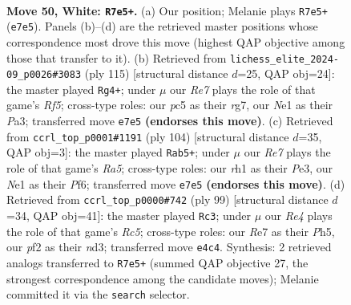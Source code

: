 \documentclass[11pt]{article}
\begin{document}
\clearpage

\begin{figure}[p]\centering
\begin{subfigure}{0.46\textwidth}\centering
\resizebox{\linewidth}{!}{%
\newchessgame
\chessboard[
  setfen={8/4R3/8/2p3kP/4R3/8/1P3p2/3KN2r w - - 1 50},
  showmover=false,
  pgfstyle=straightmove, color=movearrow, markmove={e7-e5}
]}
\caption{}
\end{subfigure}\hfill
\begin{subfigure}{0.46\textwidth}\centering
\resizebox{\linewidth}{!}{%
\newchessgame
\chessboard[
  setfen={8/6R1/4k1p1/4P1P1/r4r2/p5K1/R7/8 b - - 1 58},
  showmover=false,
  pgfstyle=straightmove, color=movearrow, markmove={f4-g4}
]}
\caption{}
\end{subfigure}
\\[4pt]
\begin{subfigure}{0.46\textwidth}\centering
\resizebox{\linewidth}{!}{%
\newchessgame
\chessboard[
  setfen={5r2/7r/1k2KP2/R1R5/1p6/p3P3/8/8 w - - 16 53},
  showmover=false,
  pgfstyle=straightmove, color=movearrow, markmove={a5-b5}
]}
\caption{}
\end{subfigure}\hfill
\begin{subfigure}{0.46\textwidth}\centering
\resizebox{\linewidth}{!}{%
\newchessgame
\chessboard[
  setfen={8/8/8/R1nk3p/p1r5/P2NK2P/8/8 b - - 3 50},
  showmover=false,
  pgfstyle=straightmove, color=movearrow, markmove={c4-c3}
]}
\caption{}
\end{subfigure}
\caption{\textbf{Move 50, White: \texttt{R7e5+}.} (a) Our position; Melanie plays \texttt{R7e5+} (\texttt{e7e5}). Panels (b)--(d) are the retrieved master positions whose correspondence most drove this move (highest QAP objective among those that transfer to it). (b) Retrieved from \texttt{lichess\_elite\_2024-09\_p0026\#3083} (ply 115) [structural distance $d$=25, QAP obj=24]: the master played \texttt{Rg4+}; under $\mu$ our \emph{Re7} plays the role of that game's \emph{Rf5}; cross-type roles: our \emph{p}c5 as their \emph{r}g7, our \emph{N}e1 as their \emph{P}a3; transferred move \texttt{e7e5} \textbf{(endorses this move)}. (c) Retrieved from \texttt{ccrl\_top\_p0001\#1191} (ply 104) [structural distance $d$=35, QAP obj=3]: the master played \texttt{Rab5+}; under $\mu$ our \emph{Re7} plays the role of that game's \emph{Ra5}; cross-type roles: our \emph{r}h1 as their \emph{P}e3, our \emph{N}e1 as their \emph{P}f6; transferred move \texttt{e7e5} \textbf{(endorses this move)}. (d) Retrieved from \texttt{ccrl\_top\_p0000\#742} (ply 99) [structural distance $d$=34, QAP obj=41]: the master played \texttt{Rc3}; under $\mu$ our \emph{Re4} plays the role of that game's \emph{Rc5}; cross-type roles: our \emph{R}e7 as their \emph{P}h5, our \emph{p}f2 as their \emph{n}d3; transferred move \texttt{e4c4}. Synthesis: 2 retrieved analogs transferred to \texttt{R7e5+} (summed QAP objective 27, the strongest correspondence among the candidate moves); Melanie committed it via the \texttt{search} selector.}
\label{fig:thought-m98}
\end{figure}
\end{document}
